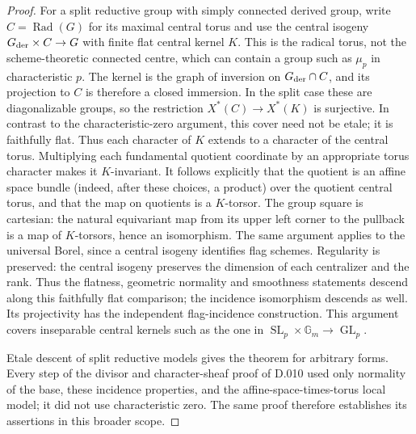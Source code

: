 \begin{proof}
For a split reductive group with simply connected derived group,
write $C=\operatorname{Rad}(G)$ for its maximal central torus and
use the central isogeny $G_{\rm der}\times C\to G$ with finite
flat central kernel $K$.  This is the radical torus, not the
scheme-theoretic connected centre, which can contain a group such
as $\mu_p$ in characteristic $p$.  The kernel is the graph of
inversion on $G_{\rm der}\cap C$, and its projection to $C$ is
therefore a closed immersion.  In the split case these are
diagonalizable groups, so the restriction
$X^*(C)\to X^*(K)$ is surjective.  In contrast to the
characteristic-zero argument, this cover need not be etale;
it is faithfully flat.  Thus each character of $K$ extends
to a character of the central torus.  Multiplying each
fundamental quotient coordinate by an appropriate torus
character makes it $K$-invariant.  It follows explicitly that
the quotient is an affine space bundle (indeed, after these
choices, a product) over the quotient central torus, and that
the map on quotients is a $K$-torsor.  The group square is
cartesian: the natural equivariant map from its upper left corner
to the pullback is a map of $K$-torsors, hence an isomorphism.
The same argument applies to the universal Borel, since a central
isogeny identifies flag schemes.  Regularity is preserved: the
central isogeny preserves the dimension of each centralizer and
the rank.  Thus the flatness, geometric normality and smoothness
statements descend along this faithfully flat comparison;
the incidence isomorphism descends as well.  Its projectivity
has the independent flag-incidence construction.  This
argument covers inseparable central kernels such as the one
in $\operatorname{SL}_p\times\mathbb G_m\to\operatorname{GL}_p$.

Etale descent of split reductive models gives the theorem for
arbitrary forms.  Every step of the divisor and character-sheaf
proof of D.010 used only normality of the base, these incidence
properties, and the affine-space-times-torus local model; it
did not use characteristic zero.  The same proof therefore
establishes its assertions in this broader scope.
\end{proof}

